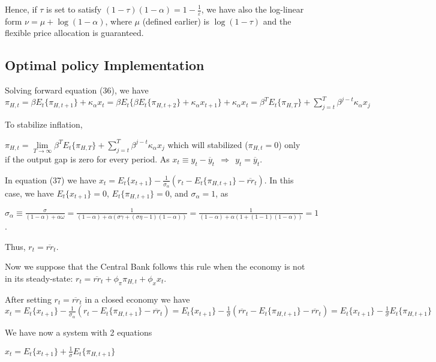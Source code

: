 \documentclass[
]{article}
\begin{document}
Hence, if \(\tau\) is set to satisfy
\(\displaystyle (1-\tau)(1-\alpha)= 1-\frac{1}{\varepsilon}\), we have
also the log-linear form \(\nu=\mu+\log(1-\alpha)\), where \(\mu\)
(defined earlier) is \(\log(1-\tau)\) and the flexible price allocation
is guaranteed.

\hypertarget{optimal-policy-implementation}{%
\subsection{Optimal policy
Implementation}\label{optimal-policy-implementation}}

Solving forward equation (36), we have
\(\displaystyle \pi_{H,t}=\beta E_t\{ \pi_{H,t+1} \}+ \kappa_\alpha x_t = \beta E_t\{ \beta E_t \{ \pi_{H,t+2} \}+ \kappa_\alpha x_{t+1}\}+ \kappa_\alpha x_t=\beta^T E_t\{\pi_{H,T}\} + \sum_{j=t}^T \beta^{j-t}\kappa_\alpha x_j\)

To stabilize inflation,

\(\displaystyle \pi_{H,t} =\underset{T \rightarrow \infty} \lim\beta^T E_t\{\pi_{H,T}\} + \sum_{j=t}^T \beta^{j-t}\kappa_\alpha x_j\)
which will stabilized (\(\pi_{H,t}=0\)) only if the output gap is zero
for every period. As
\(x_t \equiv y_t-\overline{y}_t \ \ \Rightarrow \ \ y_t=\overline{y}_t\).

In equation (37) we have
\(\displaystyle x_t = E_t\{x_{t+1}\} -\frac{1}{\sigma_\alpha}(r_t-E_t\{\pi_{H,t+1}\} -\overline{rr}_t)\).
In this case, we have \(E_t\{x_{t+1}\}=0\), \(E_t\{\pi_{H,t+1}\}=0\),
and \(\sigma_\alpha=1\), as

\(\displaystyle \sigma_\alpha \equiv \frac{\sigma}{(1-\alpha)+\alpha \omega}=\frac{1}{(1-\alpha)+\alpha (\sigma \gamma+(\sigma \eta -1 )(1-\alpha))}=\frac{1}{(1-\alpha)+\alpha (1+(1 -1 )(1-\alpha))}=1\).

Thus, \(r_t=\overline{rr}_t\).

Now we suppose that the Central Bank follows this rule when the economy
is not in its steady-state:
\(r_t=\overline{rr}_t+\phi_\pi \pi_{H,t}+\phi_x x_t\).

After setting \(r_t=\overline{rr}_t\) in a closed economy we have
\(\displaystyle x_t = E_t\{x_{t+1}\} -\frac{1}{\sigma_\alpha}(r_t-E_t\{\pi_{H,t+1}\} -\overline{rr}_t) = E_t\{x_{t+1}\} -\frac{1}{\sigma}(\overline{rr}_t-E_t\{\pi_{H,t+1}\} -\overline{rr}_t) = E_t\{x_{t+1}\} -\frac{1}{\sigma}E_t\{\pi_{H,t+1}\}\)

We have now a system with 2 equations

\(\displaystyle x_t = E_t\{x_{t+1}\} +\frac{1}{\sigma}E_t\{\pi_{H,t+1}\}\)
\end{document}
